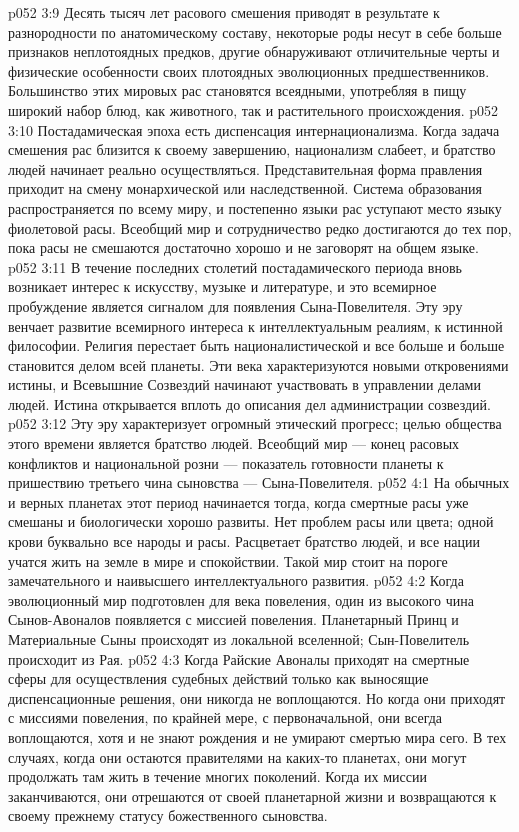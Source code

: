 \vs p052 3:9 Десять тысяч лет расового смешения приводят в результате к разнородности по анатомическому составу, некоторые роды несут в себе больше признаков неплотоядных предков, другие обнаруживают отличительные черты и физические особенности своих плотоядных эволюционных предшественников. Большинство этих мировых рас становятся всеядными, употребляя в пищу широкий набор блюд, как животного, так и растительного происхождения.
\vs p052 3:10 \pc Постадамическая эпоха есть диспенсация интернационализма. Когда задача смешения рас близится к своему завершению, национализм слабеет, и братство людей начинает реально осуществляться. Представительная форма правления приходит на смену монархической или наследственной. Система образования распространяется по всему миру, и постепенно языки рас уступают место языку фиолетовой расы. Всеобщий мир и сотрудничество редко достигаются до тех пор, пока расы не смешаются достаточно хорошо и не заговорят на общем языке.
\vs p052 3:11 В течение последних столетий постадамического периода вновь возникает интерес к искусству, музыке и литературе, и это всемирное пробуждение является сигналом для появления Сына\hyp{}Повелителя. Эту эру венчает развитие всемирного интереса к интеллектуальным реалиям, к истинной философии. Религия перестает быть националистической и все больше и больше становится делом всей планеты. Эти века характеризуются новыми откровениями истины, и Всевышние Созвездий начинают участвовать в управлении делами людей. Истина открывается вплоть до описания дел администрации созвездий.
\vs p052 3:12 Эту эру характеризует огромный этический прогресс; целью общества этого времени является братство людей. Всеобщий мир --- конец расовых конфликтов и национальной розни --- показатель готовности планеты к пришествию третьего чина сыновства --- Сына\hyp{}Повелителя.
\vs p052 4:1 На обычных и верных планетах этот период начинается тогда, когда смертные расы уже смешаны и биологически хорошо развиты. Нет проблем расы или цвета; одной крови буквально все народы и расы. Расцветает братство людей, и все нации учатся жить на земле в мире и спокойствии. Такой мир стоит на пороге замечательного и наивысшего интеллектуального развития.
\vs p052 4:2 \pc Когда эволюционный мир подготовлен для века повеления, один из высокого чина Сынов\hyp{}Авоналов появляется с миссией повеления. Планетарный Принц и Материальные Сыны происходят из локальной вселенной; Сын\hyp{}Повелитель происходит из Рая.
\vs p052 4:3 Когда Райские Авоналы приходят на смертные сферы для осуществления судебных действий только как выносящие диспенсационные решения, они никогда не воплощаются. Но когда они приходят с миссиями повеления, по крайней мере, с первоначальной, они всегда воплощаются, хотя и не знают рождения и не умирают смертью мира сего. В тех случаях, когда они остаются правителями на каких\hyp{}то планетах, они могут продолжать там жить в течение многих поколений. Когда их миссии заканчиваются, они отрешаются от своей планетарной жизни и возвращаются к своему прежнему статусу божественного сыновства.
